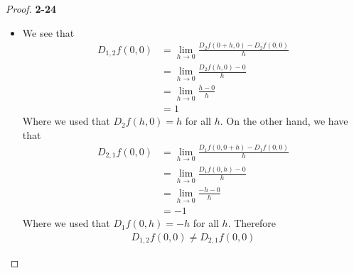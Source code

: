 \documentclass[11pt]{article}
\theoremstyle{definition}
\begin{document}
\begin{proof}{\textbf{2-24}}
\begin{itemize}
\cleardoublepage
\item [(b)] We see that
\begin{align*}
    D_{1,2}f(0,0) &= \lim_{h\to 0}\frac{D_2f(0 + h, 0) - D_2f(0 , 0)}{h}\\
    &= \lim_{h\to 0}\frac{D_2f(h, 0) - 0}{h}\\
    &= \lim_{h\to 0}\frac{h - 0}{h}\\
    &= 1
\end{align*}
Where we used that $D_2f(h, 0) = h$ for all $h$.
On the other hand, we have that
\begin{align*}
    D_{2,1}f(0,0) &= \lim_{h\to 0}\frac{D_1f(0, 0 + h) - D_1f(0 , 0)}{h}\\
    &= \lim_{h\to 0}\frac{D_1f(0, h) - 0}{h}\\
    &= \lim_{h\to 0}\frac{-h - 0}{h}\\
    &= -1
\end{align*}
Where we used that $D_1f(0, h) = -h$ for all $h$.
Therefore
\begin{align*}
    D_{1,2}f(0,0) \neq D_{2,1}f(0,0)
\end{align*}
\end{itemize}
\end{proof}
\end{document}
